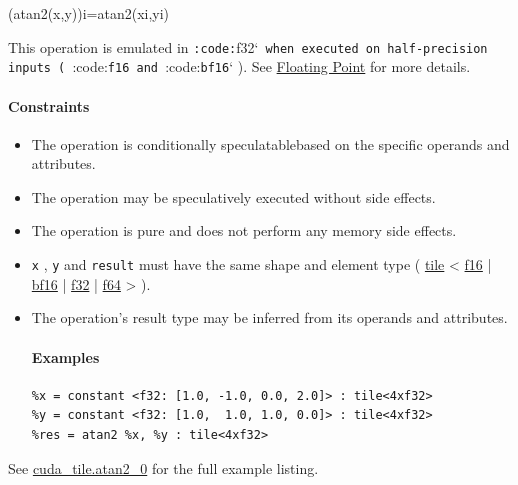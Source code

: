 \documentclass{article}
\begin{document}
(atan2(x,y))i=atan2(xi,yi)

This operation is emulated in \texttt{:code:}f32`\texttt{ when executed on half-precision inputs ( }:code:\texttt{f16}\texttt{ and }:code:\texttt{bf16}` ). See \href{https://docs.nvidia.com/cuda/tile-ir/latest/sections/operations.html#op-group-floating-point}{Floating Point} for more details.



\paragraph{Constraints}

\begin{itemize}
\item The operation is conditionally speculatablebased on the specific operands and attributes.
\item The operation may be speculatively executed without side effects.
\item The operation is pure and does not perform any memory side effects.
\item \texttt{x} , \texttt{y} and \texttt{result} must have the same shape and element type ( \href{https://docs.nvidia.com/cuda/tile-ir/latest/sections/types.html#type-tile}{tile} < \href{https://docs.nvidia.com/cuda/tile-ir/latest/sections/types.html#subsection-element-types}{f16} | \href{https://docs.nvidia.com/cuda/tile-ir/latest/sections/types.html#subsection-element-types}{bf16} | \href{https://docs.nvidia.com/cuda/tile-ir/latest/sections/types.html#subsection-element-types}{f32} | \href{https://docs.nvidia.com/cuda/tile-ir/latest/sections/types.html#subsection-element-types}{f64} > ).
\item The operation's result type may be inferred from its operands and attributes.


\paragraph{Examples}

\begin{lstlisting}
%x = constant <f32: [1.0, -1.0, 0.0, 2.0]> : tile<4xf32>
%y = constant <f32: [1.0,  1.0, 1.0, 0.0]> : tile<4xf32>
%res = atan2 %x, %y : tile<4xf32>
\end{lstlisting}

\end{itemize}
See \href{https://docs.nvidia.com/cuda/tile-ir/latest/sections/appendix.html#example-cuda-tile-atan2-0}{cuda\_tile.atan2\_0} for the full example listing.
\end{document}
